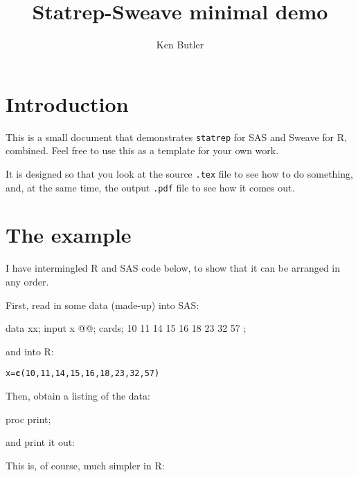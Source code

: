 \documentclass{article}\usepackage[]{graphicx}\usepackage[]{color}
\title{Statrep-Sweave minimal demo}
\author{Ken Butler}
\date{}
\makeatletter
\newcommand{\hlnum}[1]{\textcolor[rgb]{0.686,0.059,0.569}{#1}}%
\newcommand{\hlstd}[1]{\textcolor[rgb]{0.345,0.345,0.345}{#1}}%
\newcommand{\hlkwb}[1]{\textcolor[rgb]{0.69,0.353,0.396}{#1}}%
\newcommand{\hlkwd}[1]{\textcolor[rgb]{0.737,0.353,0.396}{\textbf{#1}}}%
\newenvironment{kframe}{%
 \def\at@end@of@kframe{}%
 \ifinner\ifhmode%
  \def\at@end@of@kframe{\end{minipage}}%
  \begin{minipage}{\columnwidth}%
 \fi\fi%
 \def\FrameCommand##1{\hskip\@totalleftmargin \hskip-\fboxsep
 \colorbox{shadecolor}{##1}\hskip-\fboxsep
     \hskip-\linewidth \hskip-\@totalleftmargin \hskip\columnwidth}%
 \MakeFramed {\advance\hsize-\width
   \@totalleftmargin\z@ \linewidth\hsize
   \@setminipage}}%
 {\par\unskip\endMakeFramed%
 \at@end@of@kframe}
\newenvironment{knitrout}{}{} %
\makeatother
\begin{document}
\maketitle

\section{Introduction}

This is a small document that demonstrates \texttt{statrep} for SAS
and Sweave for R, combined. Feel free
to use this as a template for your own work.

It is designed so that you look at the source \texttt{.tex} file to
see how to do something, and, at the same time, the output
\texttt{.pdf} file to see how it comes out.

\section{The example}

I have intermingled R and SAS code below, to show that it can be
arranged in any order.

First, read in some data (made-up) into SAS:

\begin{Datastep}
data xx;
  input x @@;
  cards;
  10 11 14 15 16 18 23 32 57
  ;
\end{Datastep}

and into R:

\begin{knitrout}
\color{fgcolor}\begin{kframe}
\begin{alltt}
\hlstd{x}\hlkwb{=}\hlkwd{c}\hlstd{(}\hlnum{10}\hlstd{,}\hlnum{11}\hlstd{,}\hlnum{14}\hlstd{,}\hlnum{15}\hlstd{,}\hlnum{16}\hlstd{,}\hlnum{18}\hlstd{,}\hlnum{23}\hlstd{,}\hlnum{32}\hlstd{,}\hlnum{57}\hlstd{)}
\end{alltt}
\end{kframe}
\end{knitrout}

Then, obtain a listing of the data:

\begin{Sascode}[store=a]
proc print;  
\end{Sascode}

and print it out:


This is, of course, much simpler in R:
\end{document}
